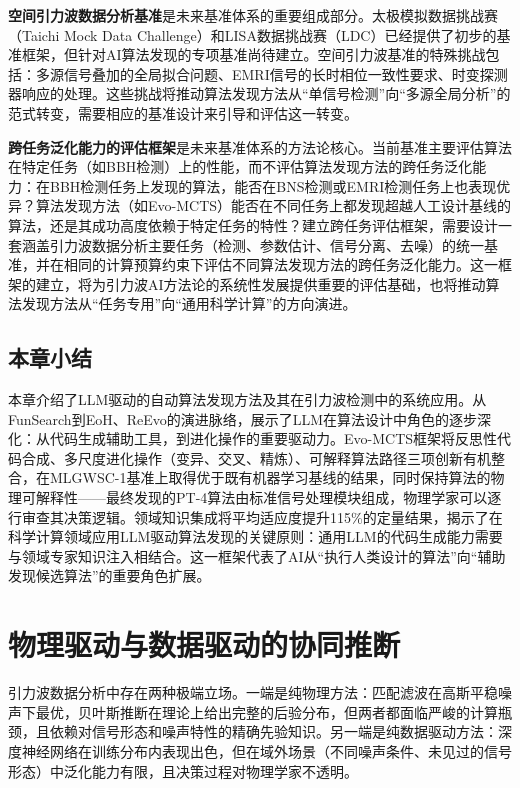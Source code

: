 \textbf{空间引力波数据分析基准}是未来基准体系的重要组成部分。太极模拟数据挑战赛（Taichi Mock Data Challenge）和LISA数据挑战赛（LDC）已经提供了初步的基准框架，但针对AI算法发现的专项基准尚待建立。空间引力波基准的特殊挑战包括：多源信号叠加的全局拟合问题、EMRI信号的长时相位一致性要求、时变探测器响应的处理。这些挑战将推动算法发现方法从“单信号检测”向“多源全局分析”的范式转变，需要相应的基准设计来引导和评估这一转变。

\textbf{跨任务泛化能力的评估框架}是未来基准体系的方法论核心。当前基准主要评估算法在特定任务（如BBH检测）上的性能，而不评估算法发现方法的跨任务泛化能力：在BBH检测任务上发现的算法，能否在BNS检测或EMRI检测任务上也表现优异？算法发现方法（如Evo-MCTS）能否在不同任务上都发现超越人工设计基线的算法，还是其成功高度依赖于特定任务的特性？建立跨任务评估框架，需要设计一套涵盖引力波数据分析主要任务（检测、参数估计、信号分离、去噪）的统一基准，并在相同的计算预算约束下评估不同算法发现方法的跨任务泛化能力。这一框架的建立，将为引力波AI方法论的系统性发展提供重要的评估基础，也将推动算法发现方法从“任务专用”向“通用科学计算”的方向演进。

\section{本章小结}

本章介绍了LLM驱动的自动算法发现方法及其在引力波检测中的系统应用。从FunSearch到EoH、ReEvo的演进脉络，展示了LLM在算法设计中角色的逐步深化：从代码生成辅助工具，到进化操作的重要驱动力。Evo-MCTS框架将反思性代码合成、多尺度进化操作（变异、交叉、精炼）、可解释算法路径三项创新有机整合，在MLGWSC-1基准上取得优于既有机器学习基线的结果，同时保持算法的物理可解释性——最终发现的PT-4算法由标准信号处理模块组成，物理学家可以逐行审查其决策逻辑。领域知识集成将平均适应度提升115\%的定量结果，揭示了在科学计算领域应用LLM驱动算法发现的关键原则：通用LLM的代码生成能力需要与领域专家知识注入相结合。这一框架代表了AI从“执行人类设计的算法”向“辅助发现候选算法”的重要角色扩展。

\chapter{物理驱动与数据驱动的协同推断}

引力波数据分析中存在两种极端立场。一端是纯物理方法：匹配滤波在高斯平稳噪声下最优，贝叶斯推断在理论上给出完整的后验分布，但两者都面临严峻的计算瓶颈，且依赖对信号形态和噪声特性的精确先验知识。另一端是纯数据驱动方法：深度神经网络在训练分布内表现出色，但在域外场景（不同噪声条件、未见过的信号形态）中泛化能力有限，且决策过程对物理学家不透明。

